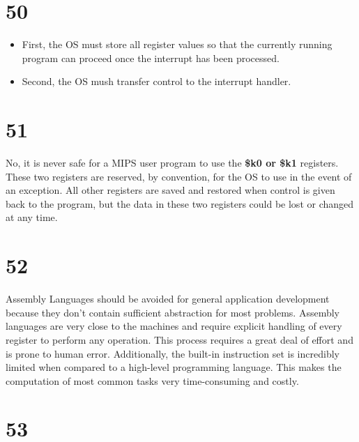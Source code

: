 \documentclass[a4paper,11pt]{article}
\begin{document}

\section*{50}
\begin{itemize}
  \item First, the OS must store all register values so that the currently running program can proceed once the interrupt has been processed.
  \item Second, the OS mush transfer control to the interrupt handler.
\end{itemize}


\section*{51}
No, it is never safe for a MIPS user program to use the {\bf \$k0 or \$k1} registers.  These two registers are reserved, by convention, for the OS to use in the event of an exception.  All other registers are saved and restored when control is given back to the program, but the data in these two registers could be lost or changed at any time.


\section*{52}
Assembly Languages should be avoided for general application development because they don't contain sufficient abstraction for most problems.  Assembly languages are very close to the machines and require explicit handling of every register to perform any operation.  This process requires a great deal of effort and is prone to human error.  Additionally, the built-in instruction set is incredibly limited when compared to a high-level programming language.  This makes the computation of most common tasks very time-consuming and costly.



\section*{53}

\end{document}
